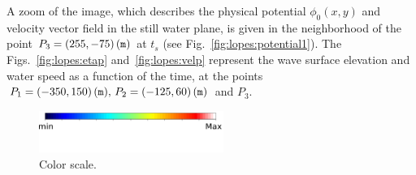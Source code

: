  A zoom of the image, which describes the physical potential
 $\phi_0(x,y)$ and velocity vector field in the still water
 plane, is given in the neighborhood of the point
 $P_3=(255,-75)\,({\tt m})$ at $t_s$ (see
 Fig.~\ref{fig:lopes:potential1}).  The
 Figs.~\ref{fig:lopes:etap} and~\ref{fig:lopes:velp}
 represent the wave surface elevation and water speed as a
 function of the time, at the points $P_1=(-350, 150)\,({\tt
   m}),\, P_2=(-125,60)\,({\tt m})$ and $P_3$.
\begin{figure}
\begin{center}
\includegraphics[width=6.0cm]{chapters/lopes/pdf/scale.pdf}
\end{center}
\caption{Color scale.}
\label{fig:lopes:scale}
\end{figure}

